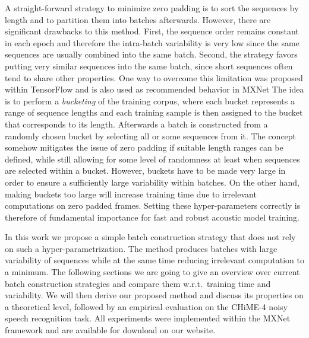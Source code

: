 \documentclass{article}
\begin{document}
    A straight-forward strategy to minimize zero padding is to sort the sequences by length and to partition them into
    batches afterwards. However, there are significant drawbacks to this method. First, the sequence order remains constant in each epoch 
    and therefore the intra-batch variability is very low since the same sequences are usually combined into the same batch. Second, the strategy favors putting very similar sequences into the same batch, since short sequences often tend to share other properties.
    One way to overcome this limitation was proposed within TensorFlow and is also used as recommended 
    behavior in MXNet The idea is to perform a \textit{bucketing} of the training corpus, where each bucket represents
    a range of sequence lengths and each training sample is then assigned to the bucket that corresponds to its length.
    Afterwards a batch is constructed from a randomly chosen bucket by selecting all or some sequences from it.
    The concept somehow mitigates the issue of zero padding if suitable length ranges can be defined, while still allowing for 
    some level of randomness at least when sequences are selected within a bucket. However, buckets have to be made very large 
    in order to ensure a sufficiently large variability within batches. On the other hand, making buckets too large will 
    increase training time due to irrelevant computations on zero padded frames. Setting these hyper-parameters correctly is
    therefore of fundamental importance for fast and robust acoustic model training.
    
    In this work we propose a simple batch construction strategy that does not rely on such a hyper-parametrization. The method 
    produces batches with large variability of sequences while at the same time reducing irrelevant computation to a minimum.
    The following sections we are going to give an overview over current batch construction strategies and compare them 
    w.r.t.~training time and variability. We will then derive our proposed method and discuss its properties on a theoretical
    level, followed by an empirical evaluation on the CHiME-4 noisy speech recognition task. All experiments were implemented 
    within the MXNet framework and are available for download on our website.
   
\end{document}
